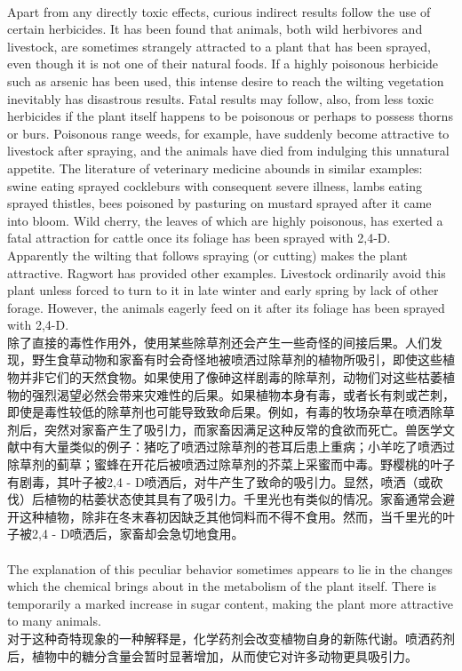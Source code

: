 \documentclass{article}
\begin{document}
\\
Apart from any directly toxic effects, curious indirect results follow the use of certain herbicides. It has been found that animals, both wild herbivores and livestock, are sometimes strangely attracted to a plant that has been sprayed, even though it is not one of their natural foods. If a highly poisonous herbicide such as arsenic has been used, this intense desire to reach the wilting vegetation inevitably has disastrous results. Fatal results may follow, also, from less toxic herbicides if the plant itself happens to be poisonous or perhaps to possess thorns or burs. Poisonous range weeds, for example, have suddenly become attractive to livestock after spraying, and the animals have died from indulging this unnatural appetite. The literature of veterinary medicine abounds in similar examples: swine eating sprayed cockleburs with consequent severe illness, lambs eating sprayed thistles, bees poisoned by pasturing on mustard sprayed after it came into bloom. Wild cherry, the leaves of which are highly poisonous, has exerted a fatal attraction for cattle once its foliage has been sprayed with 2,4-D. Apparently the wilting that follows spraying (or cutting) makes the plant attractive. Ragwort has provided other examples. Livestock ordinarily avoid this plant unless forced to turn to it in late winter and early spring by lack of other forage. However, the animals eagerly feed on it after its foliage has been sprayed with 2,4-D. \\
除了直接的毒性作用外，使用某些除草剂还会产生一些奇怪的间接后果。人们发现，野生食草动物和家畜有时会奇怪地被喷洒过除草剂的植物所吸引，即使这些植物并非它们的天然食物。如果使用了像砷这样剧毒的除草剂，动物们对这些枯萎植物的强烈渴望必然会带来灾难性的后果。如果植物本身有毒，或者长有刺或芒刺，即使是毒性较低的除草剂也可能导致致命后果。例如，有毒的牧场杂草在喷洒除草剂后，突然对家畜产生了吸引力，而家畜因满足这种反常的食欲而死亡。兽医学文献中有大量类似的例子：猪吃了喷洒过除草剂的苍耳后患上重病；小羊吃了喷洒过除草剂的蓟草；蜜蜂在开花后被喷洒过除草剂的芥菜上采蜜而中毒。野樱桃的叶子有剧毒，其叶子被2,4 - D喷洒后，对牛产生了致命的吸引力。显然，喷洒（或砍伐）后植物的枯萎状态使其具有了吸引力。千里光也有类似的情况。家畜通常会避开这种植物，除非在冬末春初因缺乏其他饲料而不得不食用。然而，当千里光的叶子被2,4 - D喷洒后，家畜却会急切地食用。 \\

\\
The explanation of this peculiar behavior sometimes appears to lie in the changes which the chemical brings about in the metabolism of the plant itself. There is temporarily a marked increase in sugar content, making the plant more attractive to many animals.\\
对于这种奇特现象的一种解释是，化学药剂会改变植物自身的新陈代谢。喷洒药剂后，植物中的糖分含量会暂时显著增加，从而使它对许多动物更具吸引力。 \\
\end{document}
